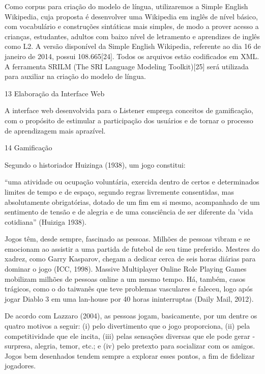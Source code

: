 Como corpus para cria\c{c}\~ao do modelo de l\'ingua, utilizaremos a Simple
English Wikipedia, cuja proposta \'e desenvolver uma Wikipedia em ingl\^es
de n\'ivel b\'asico, com vocabul\'ario e constru\c{c}\~oes sint\'aticas mais simples,
de modo a prover acesso a crian\c{c}as, estudantes, adultos com baixo n\'ivel
de letramento e aprendizes de ingl\^es como L2. A vers\~ao dispon\'ivel da
Simple English Wikipedia, referente ao dia 16 de janeiro de 2014, possui
108.665{[}24{]}. Todos os arquivos est\~ao codificados em XML. A
ferramenta SRILM (The SRI Language Modeling Toolkit){[}25{]} ser\'a
utilizada para auxiliar na cria\c{c}\~ao do modelo de l\'ingua.

13 Elabora\c{c}\~ao da Interface Web

A interface web desenvolvida para o Listener emprega conceitos de
gamifica\c{c}\~ao, com o prop\'osito de estimular a participa\c{c}\~ao dos usu\'arios e
de tornar o processo de aprendizagem mais apraz\'ivel.

14 Gamifica\c{c}\~ao

Segundo o historiador Huizinga (1938), um jogo constitui:

``uma atividade ou ocupa\c{c}\~ao volunt\'aria, exercida dentro de certos e
determinados limites de tempo e de espa\c{c}o, segundo regras livremente
consentidas, mas absolutamente obrigat\'orias, dotado de um fim em si
mesmo, acompanhado de um sentimento de tens\~ao e de alegria e de uma
consci\^encia de ser diferente da 'vida cotidiana'' (Huiziga 1938).

Jogos t\^em, desde sempre, fascinado as pessoas. Milh\~oes de pessoas vibram
e se emocionam ao assistir a uma partida de futebol de seu time
preferido. Mestres do xadrez, como Garry Kasparov, chegam a dedicar
cerca de seis horas di\'arias para dominar o jogo (ICC, 1998). Massive
Multiplayer Online Role Playing Games mobilizam milh\~oes de pessoas
online a um mesmo tempo. H\'a, tamb\'em, casos tr\'agicos, como o do taiwan\^es
que teve problemas vasculares e faleceu, logo ap\'os jogar Diablo 3 em uma
lan-house por 40 horas ininterruptas (Daily Mail, 2012).

De acordo com Lazzaro (2004), as pessoas jogam, basicamente, por um
dentre os quatro motivos a seguir: (i) pelo divertimento que o jogo
proporciona, (ii) pela competitividade que ele incita, (iii) pelas
sensa\c{c}\~oes diversas que ele pode gerar - surpresa, alegria, temor, etc.;
e (iv) pelo pretexto para socializar com os amigos. Jogos bem desenhados
tendem sempre a explorar esses pontos, a fim de fidelizar jogadores.

